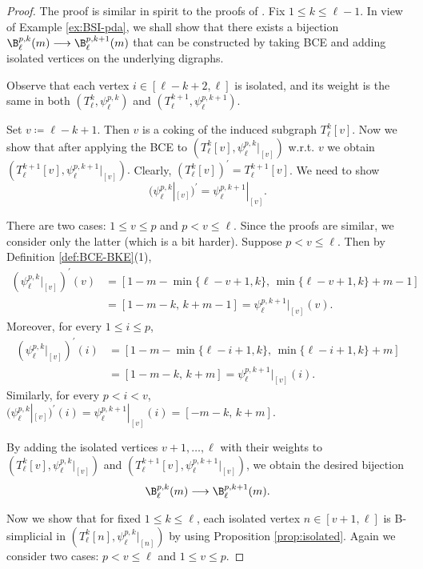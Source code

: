  \begin{proof}
 The proof is similar in spirit to the proofs of \cite[Propositions 7.12 and 7.16]{MRT24}. 
Fix $1 \le k \le \ell-1$. 
In view of Example \ref{ex:BSI-pda}, we shall show that there exists a bijection $ \B^{p,k}_\ell(m) \longrightarrow \B^{p,k+1}_\ell(m)$ that can be constructed by taking BCE and adding isolated vertices on the underlying digraphs. 

Observe that each vertex $ i \in [\ell-k+2, \ell] $ is isolated, and its weight is the same in both $ (T_{\ell}^{k}, \psi_{\ell}^{p,k}) $ and $(T_{\ell}^{k+1}, \psi_{\ell}^{p,k+1})$.

Set $ v  \coloneqq  \ell-k+1$. 
Then $v$ is a coking of  the induced subgraph $ T_{\ell}^{k}[v] $. 
Now we show that after applying the BCE to $ (T_{\ell}^{k}[v], \psi_{\ell}^{p, k}|_{[v]}) $ w.r.t. $ v $ 
we obtain $ (T_{\ell}^{k+1}[v], \psi_{\ell}^{p,k+1}|_{[v]}) .$
Clearly, $ (T_{\ell}^{k}[v])^{\prime} = T_{\ell}^{k+1}[v] $. 
We need to show
\begin{equation*}
\label{eq:coking-v}
  (\psi_{\ell}^{p,k}|_{[v]})^{\prime}  =  \psi_{\ell}^{p,k+1}|_{[v]} .
\end{equation*}

There are two cases: $1 \leq   v \leq p$ and $p<   v \leq \ell$. 
Since the proofs are similar, we consider only the latter (which is a bit harder).
Suppose $p<   v \leq \ell$. 
Then by Definition \ref{def:BCE-BKE}(1), 
\begin{align*}
( \psi_{\ell}^{p,k}|_{[v]})^{\prime}(v) &=[1-m-\min\{\ell-v+1, k\},\,\min\{\ell-v+1, k\}+m-1]  \\
&= [1-m-k,\,k+m-1]  = \psi_{\ell}^{p,k+1}|_{[v]}(v). 
\end{align*}
Moreover, for every $ 1 \le i \le p $, 
\begin{align*}
( \psi_{\ell}^{p,k}|_{[v]})^{\prime}(i) &=[1-m-\min\{\ell-i+1, k\},\,\min\{\ell-i+1, k\}+m] \\
&=[1-m-k,\,k+m]   = \psi_{\ell}^{p,k+1}|_{[v]}(i).
\end{align*}
Similarly, for every $ p< i < v $, $( \psi_{\ell}^{p,k}|_{[v]})^{\prime}(i) =  \psi_{\ell}^{p,k+1}|_{[v]}(i)=[-m-k,\,k+m] $.


By adding the isolated vertices $v+1, \dots, \ell $ with their weights to  $ (T_{\ell}^{k}[v], \psi_{\ell}^{p,k}|_{[v]})$ and $  (T_{\ell}^{k+1}[v], \psi_{\ell}^{p,k+1}|_{[v]})$, we obtain the desired bijection 
$$ \B^{p,k}_\ell(m) \longrightarrow \B^{p,k+1}_\ell(m).$$ 

Now we show that for fixed $1 \le k \le \ell$, each isolated vertex $n \in [v+1, \ell] $ is  B-simplicial in  $ (T_{\ell}^{k}[n], \psi_{\ell}^{p,k}|_{[n]})$ by using Proposition \ref{prop:isolated}. 
Again we consider two cases: $p<   v \leq \ell$ and  $1 \leq   v \leq p$. 


\end{proof}
